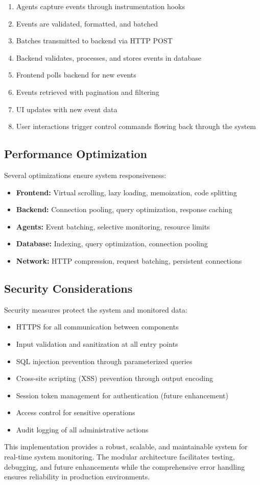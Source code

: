 \begin{enumerate}
    \item Agents capture events through instrumentation hooks
    \item Events are validated, formatted, and batched
    \item Batches transmitted to backend via HTTP POST
    \item Backend validates, processes, and stores events in database
    \item Frontend polls backend for new events
    \item Events retrieved with pagination and filtering
    \item UI updates with new event data
    \item User interactions trigger control commands flowing back through the system
\end{enumerate}

\subsection{Performance Optimization}

Several optimizations ensure system responsiveness:

\begin{itemize}
    \item \textbf{Frontend:} Virtual scrolling, lazy loading, memoization, code splitting
    \item \textbf{Backend:} Connection pooling, query optimization, response caching
    \item \textbf{Agents:} Event batching, selective monitoring, resource limits
    \item \textbf{Database:} Indexing, query optimization, connection pooling
    \item \textbf{Network:} HTTP compression, request batching, persistent connections
\end{itemize}

\subsection{Security Considerations}

Security measures protect the system and monitored data:

\begin{itemize}
    \item HTTPS for all communication between components
    \item Input validation and sanitization at all entry points
    \item SQL injection prevention through parameterized queries
    \item Cross-site scripting (XSS) prevention through output encoding
    \item Session token management for authentication (future enhancement)
    \item Access control for sensitive operations
    \item Audit logging of all administrative actions
\end{itemize}

This implementation provides a robust, scalable, and maintainable system for real-time system monitoring. The modular architecture facilitates testing, debugging, and future enhancements while the comprehensive error handling ensures reliability in production environments.